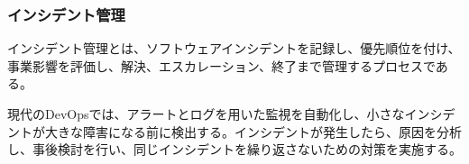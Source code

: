 \subsubsection{インシデント管理}

インシデント管理とは、ソフトウェアインシデントを記録し、優先順位を付け、事業影響を評価し、解決、エスカレーション、終了まで管理するプロセスである。

現代のDevOpsでは、アラートとログを用いた監視を自動化し、小さなインシデントが大きな障害になる前に検出する。インシデントが発生したら、原因を分析し、事後検討を行い、同じインシデントを繰り返さないための対策を実施する。
